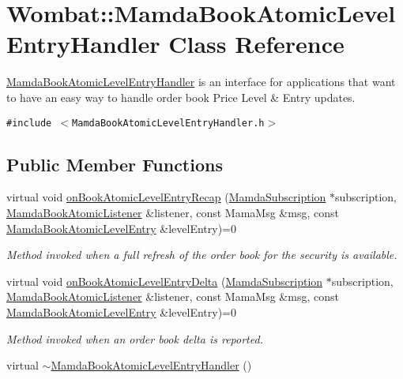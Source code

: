 \hypertarget{classWombat_1_1MamdaBookAtomicLevelEntryHandler}{
\section{Wombat::Mamda\-Book\-Atomic\-Level\-Entry\-Handler Class Reference}
\label{classWombat_1_1MamdaBookAtomicLevelEntryHandler}
}
\hyperlink{classWombat_1_1MamdaBookAtomicLevelEntryHandler}{Mamda\-Book\-Atomic\-Level\-Entry\-Handler} is an interface for applications that want to have an easy way to handle order book Price Level \& Entry updates.  


{\tt \#include $<$Mamda\-Book\-Atomic\-Level\-Entry\-Handler.h$>$}

\subsection*{Public Member Functions}
\begin{CompactItemize}
\item 
virtual void \hyperlink{classWombat_1_1MamdaBookAtomicLevelEntryHandler_f0b3d4101df368122f799f2f55793c3a}{on\-Book\-Atomic\-Level\-Entry\-Recap} (\hyperlink{classWombat_1_1MamdaSubscription}{Mamda\-Subscription} $\ast$subscription, \hyperlink{classWombat_1_1MamdaBookAtomicListener}{Mamda\-Book\-Atomic\-Listener} \&listener, const Mama\-Msg \&msg, const \hyperlink{classWombat_1_1MamdaBookAtomicLevelEntry}{Mamda\-Book\-Atomic\-Level\-Entry} \&level\-Entry)=0
\begin{CompactList}\small\item\em Method invoked when a full refresh of the order book for the security is available. \item\end{CompactList}\item 
virtual void \hyperlink{classWombat_1_1MamdaBookAtomicLevelEntryHandler_a3a33ed581eed6abe4738bdced91cfb5}{on\-Book\-Atomic\-Level\-Entry\-Delta} (\hyperlink{classWombat_1_1MamdaSubscription}{Mamda\-Subscription} $\ast$subscription, \hyperlink{classWombat_1_1MamdaBookAtomicListener}{Mamda\-Book\-Atomic\-Listener} \&listener, const Mama\-Msg \&msg, const \hyperlink{classWombat_1_1MamdaBookAtomicLevelEntry}{Mamda\-Book\-Atomic\-Level\-Entry} \&level\-Entry)=0
\begin{CompactList}\small\item\em Method invoked when an order book delta is reported. \item\end{CompactList}\item 
virtual \hyperlink{classWombat_1_1MamdaBookAtomicLevelEntryHandler_9192c0bbed11d9a84680eb024b0a908f}{$\sim$Mamda\-Book\-Atomic\-Level\-Entry\-Handler} ()
\end{CompactItemize}



